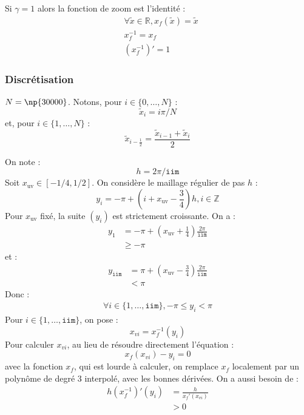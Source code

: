 \documentclass[a4paper,english,french]{article}
\begin{document}
Si $\gamma = 1$ alors la fonction de zoom est l'identité :
\begin{align*}
  & \forall \tilde x \in \mathbb{R}, x_f(\tilde x) = \tilde x \\
  & x_f^{-1} = x_f \\
  & (x_f^{-1})' = 1
\end{align*}

\subsubsection{Discrétisation}

$N = \np{30000}$. Notons, pour $i \in \{0, \dots, N\}$ :
\begin{equation*}
  \tilde x_i = i \pi / N
\end{equation*}
et, pour $i \in \{1, \dots, N\}$ :
\begin{equation*}
  \tilde x_{i - \frac{1}{2}} = \frac{\tilde x_{i - 1} + \tilde x_i}{2}
\end{equation*}

On note :
\begin{equation*}
  h = 2 \pi / \mathtt{iim}
\end{equation*}
Soit $x_\mathrm{uv} \in [- 1 / 4, 1 / 2]$. On considère le maillage
régulier de pas $h$ :
\begin{equation*}
  y_i = - \pi + \left(i + x_\mathrm{uv} - \frac{3}{4} \right) h, i \in \mathbb{Z}
\end{equation*}
Pour $x_\mathrm{uv}$ fixé, la suite $(y_i)$ est strictement
croissante. On a :
\begin{align*}
  y_1
  & =
  - \pi + \left(x_\mathrm{uv} + \frac{1}{4} \right) \frac{2 \pi}{\mathtt{iim}} \\
  & \ge - \pi
\end{align*}
et :
\begin{align*}
  y_\mathtt{iim}
  & =
  \pi + \left(x_\mathrm{uv} - \frac{3}{4} \right) \frac{2 \pi}{\mathtt{iim}} \\
  & < \pi
\end{align*}
Donc :
\begin{align*}
  \forall i \in \{1, \dots, \mathtt{iim}\}, - \pi \le y_i < \pi
\end{align*}
Pour $i \in \{1, \dots, \mathtt{iim}\}$, on pose :
\begin{equation*}
  x_{vi} = x_f^{-1}(y_i)
\end{equation*}
Pour calculer $x_{vi}$, au lieu de résoudre directement l'équation :
\begin{equation*}
  x_f(x_{vi}) - y_i = 0
\end{equation*}
avec la fonction $x_f$, qui est lourde à calculer, on remplace $x_f$
localement par un polynôme de degré 3 interpolé, avec les bonnes
dérivées.  On a aussi besoin de :
\begin{align*}
  h (x_f^{-1})'(y_i)  & = \frac{h}{x_f'(x_{vi})} \\
  & > 0
\end{align*}
\end{document}
